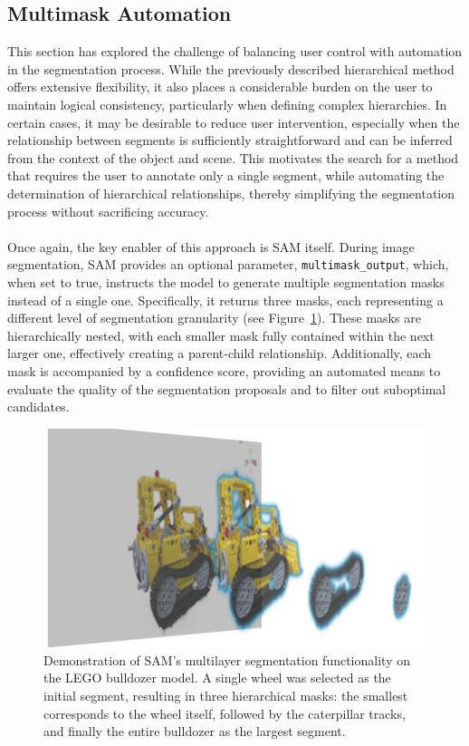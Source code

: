 \documentclass[12pt]{article}
\begin{document}
\subsection{Multimask Automation}
This section has explored the challenge of balancing user control with automation in the segmentation process. While the previously described hierarchical method offers extensive flexibility, it also places a considerable burden on the user to maintain logical consistency, particularly when defining complex hierarchies. In certain cases, it may be desirable to reduce user intervention, especially when the relationship between segments is sufficiently straightforward and can be inferred from the context of the object and scene. This motivates the search for a method that requires the user to annotate only a single segment, while automating the determination of hierarchical relationships, thereby simplifying the segmentation process without sacrificing accuracy.
\\\\
Once again, the key enabler of this approach is SAM itself. During image segmentation, SAM provides an optional parameter, \texttt{multimask\_output}, which, when set to true, instructs the model to generate multiple segmentation masks instead of a single one. Specifically, it returns three masks, each representing a different level of segmentation granularity (see Figure~\ref{fig:multidemo}). These masks are hierarchically nested, with each smaller mask fully contained within the next larger one, effectively creating a parent-child relationship. Additionally, each mask is accompanied by a confidence score, providing an automated means to evaluate the quality of the segmentation proposals and to filter out suboptimal candidates.
\begin{figure}[h!]
	\centering
	\includegraphics[width=\textwidth]{Images/multidemo.png}
	\caption{Demonstration of SAM’s multilayer segmentation functionality on the LEGO bulldozer model. A single wheel was selected as the initial segment, resulting in three hierarchical masks: the smallest corresponds to the wheel itself, followed by the caterpillar tracks, and finally the entire bulldozer as the largest segment.
	}
	\label{fig:multidemo}
\end{figure}
\end{document}
